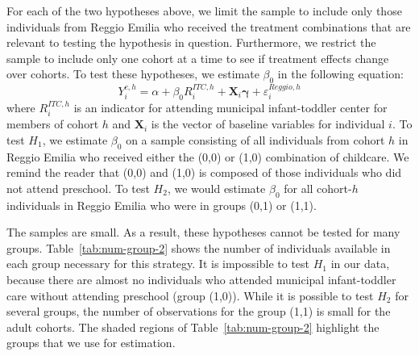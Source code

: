 For each of the two hypotheses above, we limit the sample to include only those individuals from Reggio Emilia who received the treatment combinations that are relevant to testing the hypothesis in question. Furthermore, we restrict the sample to include only one cohort at a time to see if treatment effects change over cohorts. To test these hypotheses, we estimate $\beta_{0}$ in the following equation:
\begin{equation}
Y_{i}^{c,h} = \alpha + \beta_{0}R_i^{ITC,h} + \mathbf{X}_i \bm{\gamma} + \varepsilon_{i}^{Reggio,h}
\end{equation}
where $R_i^{ITC,h}$ is an indicator for attending municipal infant-toddler center for members of cohort $h$ and $\mathbf{X}_i$ is the vector of baseline variables for individual $i$. To test $H_1$, we estimate $\beta_0$ on a sample consisting of all individuals from cohort $h$ in Reggio Emilia who received either the (0,0) or (1,0) combination of childcare. We remind the reader that (0,0) and (1,0) is composed of those individuals who did not attend preschool. To test $H_2$, we would estimate $\beta_0$ for all cohort-$h$ individuals in Reggio Emilia who were in groups (0,1) or (1,1).

The samples are small. As a result, these hypotheses cannot be tested for many groups. Table~\ref{tab:num-group-2} shows the number of individuals available in each group necessary for this strategy. It is impossible to test $H_1$ in our data, because there are almost no individuals who attended municipal infant-toddler care without attending preschool (group (1,0)). While it is possible to test $H_2$ for several groups, the number of observations for the group (1,1) is small for the adult cohorts. The shaded regions of Table~\ref{tab:num-group-2} highlight the groups that we use for estimation.


